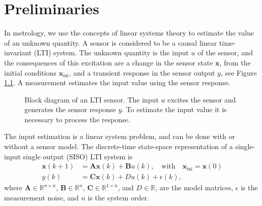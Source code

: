 \glsresetall

\chapter{Preliminaries} \label{chap:Preliminaries}


In metrology, we use the concepts of linear systems theory to estimate the value of an unknown quantity.
A sensor is considered to be a causal linear time-invariant (LTI) system.
The unknown quantity is the input ${u}$ of the sensor, and the consequences of this excitation are a change in the sensor state $\mathbf{x}$, from the initial conditions $\mathbf{x}_{\text{ini}}$, and a transient response in the sensor output ${y}$, see Figure \ref{fig:sysLTI}.  
A measurement estimates the input value using the sensor response.

\begin{figure}[htb!]
\centering
{}
 \caption{Block diagram of an LTI sensor. The input ${u}$ excites the sensor and generates the sensor response ${y}$. To estimate the input value it is necessary to process the response.} \label{fig:sysLTI}
 \end{figure}

The input estimation is a linear system problem, and can be done with or without a sensor model.
The discrete-time state-space representation of a single-input single output (SISO) LTI system is
\begin{equation} \begin{aligned} \mathbf{x}(k+1) &= \mathbf{A} \mathbf{x}(k) + \mathbf{B} {u}(k), \quad \text{with} \quad \mathbf{x}_{\text{ini}} = \mathbf{x}(0) \\ 
{y}(k) &= \mathbf{C} \mathbf{x}(k) + {D} {u}(k) + {\epsilon}(k),  \label{eqn:dtsslti} \end{aligned} \end{equation}
where $\mathbf{A} \in \mathbb{R}^{n \times n}$, $\mathbf{B} \in \mathbb{R}^{n}$, $\mathbf{C} \in \mathbb{R}^{1 \times n}$, and ${D} \in \mathbb{R}$, are the model matrices, $\epsilon$ is the measurement noise, and $n$ is the system order. %

